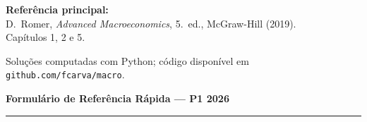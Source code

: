 \documentclass[12pt, a4paper]{article}
\begin{document}
\begin{titlepage}
\begin{center}
\vspace{1.5em}
\begin{tcolorbox}[standard, colback=boxbg, colframe=boxborder, width=0.88\textwidth,
  arc=4pt, boxrule=1pt, left=8pt, right=8pt, top=6pt, bottom=6pt]
\centering
\textbf{Referência principal:}\\[0.3em]
D.\ Romer, \textit{Advanced Macroeconomics}, 5.\textordfeminine\ ed., McGraw-Hill (2019).\\
Capítulos 1, 2 e 5.
\end{tcolorbox}

\vfill
{\small Soluções computadas com Python; código disponível em
\texttt{github.com/fcarva/macro}.}
\end{center}
\end{titlepage}

\newpage
\thispagestyle{fancy}

\begin{center}
{\large\bfseries\color{cyanrbc} Formulário de Referência Rápida --- P1 2026}\\[0.3em]
\rule{\linewidth}{0.6pt}
\end{center}
\end{document}
